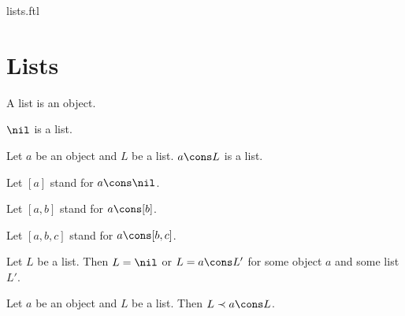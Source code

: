 \documentclass{naproche-library}
\begin{document}
\begin{smodule}{lists.ftl}


  \section*{Lists}

  \begin{signature}[forthel,id=LISTS_LISTS_4578620297183232,printid]
    A list is an object.
  \end{signature}

  \begin{signature}[forthel,id=LISTS_LISTS_3703161885818880,printid]
    $\nil$ is a list.
  \end{signature}

  \begin{signature}[forthel,id=LISTS_LISTS_8050301789536256,printid]
    Let $a$ be an object and $L$ be a list.
    $a \cons L$ is a list.

    Let $[a]$ stand for $a \cons \nil$.
    
    Let $[a,b]$ stand for $a \cons [b]$.
    
    Let $[a,b,c]$ stand for $a \cons [b,c]$.
  \end{signature}

  \begin{axiom}[forthel,id=LISTS_LISTS_4512036658964875,printid]
    Let $L$ be a list.
    Then $L = \nil$ or $L = a \cons L'$ for some object $a$ and some list $L'$.
  \end{axiom}

  \begin{axiom}[forthel,id=LISTS_LISTS_1021563255448756,printid]
    Let $a$ be an object and $L$ be a list.
    Then $L \prec a \cons L$.
  \end{axiom}
\end{smodule}
\end{document}
